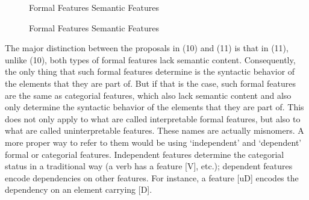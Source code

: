 \documentclass[output=paper
,modfonts
,nonflat]{langsci/langscibook}
\begin{document}
\begin{figure}[!h]
\begin{exe}
\ex \hspace{1.5cm} Formal Features \hspace{0.8cm} Semantic Features \\
\end{exe}
\end{figure}
\begin{figure}[!h]
\begin{exe}
\ex \hspace{1.5cm} Formal Features \hspace{4cm} Semantic Features \\ 
\end{exe}
\end{figure}
\newpage \noindent The major distinction between the proposals in (10) and (11) is that in (11), unlike (10), both types of formal features lack semantic content. Consequently, the only thing that such formal features determine is the syntactic behavior of the elements that they are part of. But if that is the case, such formal features are the same as categorial features, which also lack semantic content and also only determine the syntactic behavior of the elements that they are part of. This does not only apply to what are called interpretable formal features, but also to what are called uninterpretable features. These names are actually misnomers. A more proper way to refer to them would be using ‘independent’ and ‘dependent’ formal or categorial features. Independent features determine the categorial status in a traditional way (a verb has a feature [V], etc.); dependent features encode dependencies on other features. For instance, a feature [uD] encodes the dependency on an element carrying [D].
\end{document}
